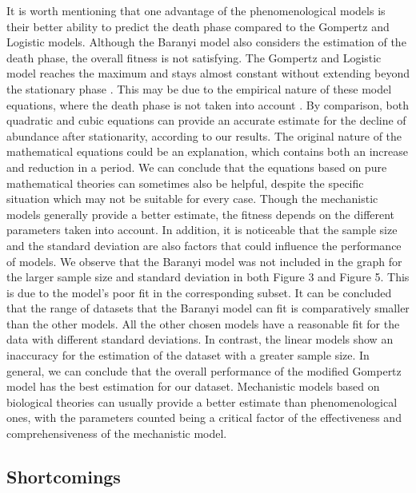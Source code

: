 \documentclass[11pt, oneside]{article}
\begin{document}
	\noindent It is worth mentioning that one advantage of the phenomenological models is their better ability to predict the death phase compared to the Gompertz and Logistic models. Although the Baranyi model also considers the estimation of the death phase, the overall fitness is not satisfying. The Gompertz and Logistic model reaches the maximum and stays almost constant without extending beyond the stationary phase \cite{whiting1992quantitative}. This may be due to the empirical nature of these model equations, where the death phase is not taken into account \cite{chowdhury2007validity}. By comparison, both quadratic and cubic equations can provide an accurate estimate for the decline of abundance after stationarity, according to our results. The original nature of the mathematical equations could be an explanation, which contains both an increase and reduction in a period. We can conclude that the equations based on pure mathematical theories can sometimes also be helpful, despite the specific situation which may not be suitable for every case. Though the mechanistic models generally provide a better estimate, the fitness depends on the different parameters taken into account. 
	\bigbreak
	\noindent In addition, it is noticeable that the sample size and the standard deviation are also factors that could influence the performance of models. We observe that the Baranyi model was not included in the graph for the larger sample size and standard deviation in both Figure 3 and Figure 5. This is due to the model's poor fit in the corresponding subset. It can be concluded that the range of datasets that the Baranyi model can fit is comparatively smaller than the other models. All the other chosen models have a reasonable fit for the data with different standard deviations. In contrast, the linear models show an inaccuracy for the estimation of the dataset with a greater sample size. 
	\bigbreak
	\noindent In general, we can conclude that the overall performance of the modified Gompertz model has the best estimation for our dataset. Mechanistic models based on biological theories can usually provide a better estimate than phenomenological ones, with the parameters counted being a critical factor of the effectiveness and comprehensiveness of the mechanistic model. 
	
	\subsection{Shortcomings}
	
\end{document}

